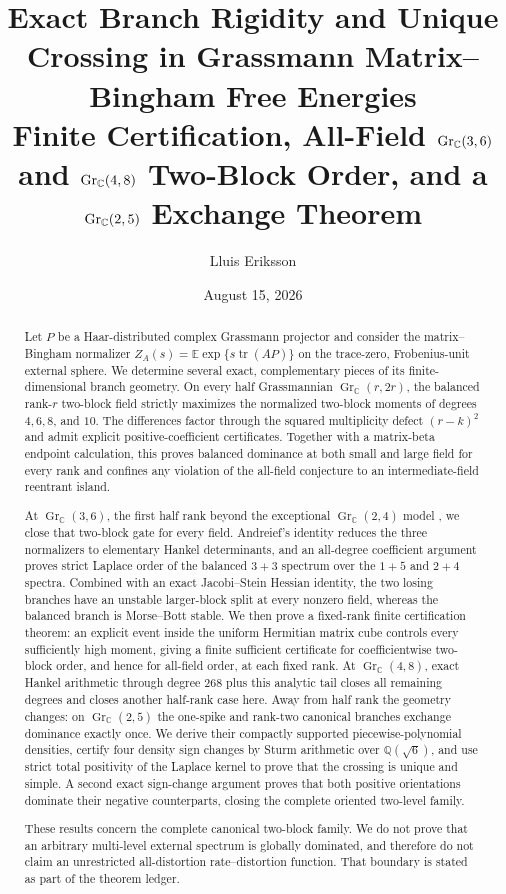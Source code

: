 \documentclass[11pt]{article}
\title{\bfseries Exact Branch Rigidity and Unique Crossing in Grassmann Matrix--Bingham Free Energies\\[3pt]
\large Finite Certification, All-Field $\Gr_{\C}(3,6)$ and $\Gr_{\C}(4,8)$ Two-Block Order, and a $\Gr_{\C}(2,5)$ Exchange Theorem}
\author{Lluis Eriksson}
\date{August 15, 2026}
\newcommand{\E}{\mathbb E}
\newcommand{\C}{\mathbb C}
\newcommand{\tr}{\operatorname{tr}}
\newcommand{\Gr}{\operatorname{Gr}}
\begin{document}
\maketitle

\begin{abstract}
Let $P$ be a Haar-distributed complex Grassmann projector and consider the
matrix--Bingham normalizer $Z_A(s)=\E\exp\{s\tr(AP)\}$ on the trace-zero,
Frobenius-unit external sphere.  We determine several exact, complementary
pieces of its finite-dimensional branch geometry.  On every half
Grassmannian $\Gr_{\C}(r,2r)$, the balanced rank-$r$ two-block field strictly
maximizes the normalized two-block moments of degrees $4,6,8$, and $10$.
The differences factor through the squared multiplicity defect
$(r-k)^2$ and admit explicit positive-coefficient certificates.  Together
with a matrix-beta endpoint calculation, this proves balanced dominance at
both small and large field for every rank and confines any violation of the
all-field conjecture to an intermediate-field reentrant island.

At $\Gr_{\C}(3,6)$, the first half rank beyond the exceptional
$\Gr_{\C}(2,4)$ model \cite{ErikssonRankTwo2026}, we close that two-block
gate for every field.  Andreief's identity reduces the three
normalizers to elementary Hankel determinants, and an all-degree coefficient
argument proves strict Laplace order of the balanced $3+3$ spectrum over the
$1+5$ and $2+4$ spectra.  Combined with an exact Jacobi--Stein Hessian
identity, the two losing branches have an unstable larger-block split at
every nonzero field, whereas
the balanced branch is Morse--Bott stable.  We then prove a fixed-rank finite
certification theorem: an explicit event inside the uniform Hermitian matrix
 cube controls every sufficiently high moment, giving a finite sufficient
 certificate for coefficientwise two-block order, and hence for all-field
 order, at each fixed rank.  At
$\Gr_{\C}(4,8)$, exact Hankel arithmetic through degree $268$ plus this
 analytic tail closes all remaining degrees and closes another half-rank case
 here.  Away from half rank the geometry changes: on $\Gr_{\C}(2,5)$ the
one-spike and rank-two canonical branches
exchange dominance exactly once.  We derive their compactly supported
piecewise-polynomial densities, certify four density sign changes by Sturm
arithmetic over $\mathbb Q(\sqrt6)$, and use strict total positivity of the
Laplace kernel to prove that the crossing is unique and simple.  A second
exact sign-change argument proves that both positive orientations dominate
their negative counterparts, closing the complete oriented two-level family.

These results concern the complete canonical two-block family.  We do not
prove that an arbitrary multi-level external spectrum is globally dominated,
and therefore do not claim an unrestricted all-distortion rate--distortion
function.  That boundary is stated as part of the theorem ledger.
\end{abstract}
\end{document}
